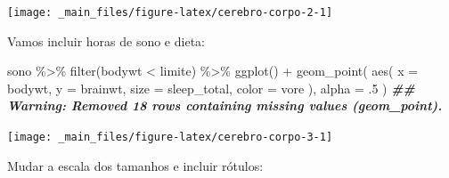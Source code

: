 \documentclass[
  11pt]{report}
\newenvironment{Shaded}{\begin{snugshade}}{\end{snugshade}}
\newcommand{\AttributeTok}[1]{\textcolor[rgb]{0.77,0.63,0.00}{#1}}
\newcommand{\DecValTok}[1]{\textcolor[rgb]{0.00,0.00,0.81}{#1}}
\newcommand{\DocumentationTok}[1]{\textcolor[rgb]{0.56,0.35,0.01}{\textbf{\textit{#1}}}}
\newcommand{\FunctionTok}[1]{\textcolor[rgb]{0.00,0.00,0.00}{#1}}
\newcommand{\NormalTok}[1]{#1}
\newcommand{\SpecialCharTok}[1]{\textcolor[rgb]{0.00,0.00,0.00}{#1}}
\begin{document}
\begin{center}\texttt{[image: \_main\_files/figure-latex/cerebro-corpo-2-1]} \end{center}

Vamos incluir horas de sono e dieta:

\begin{Shaded}
\begin{Highlighting}[]
\NormalTok{sono }\SpecialCharTok{\%\textgreater{}\%} 
  \FunctionTok{filter}\NormalTok{(bodywt }\SpecialCharTok{\textless{}}\NormalTok{ limite) }\SpecialCharTok{\%\textgreater{}\%} 
  \FunctionTok{ggplot}\NormalTok{() }\SpecialCharTok{+}
    \FunctionTok{geom\_point}\NormalTok{(}
      \FunctionTok{aes}\NormalTok{(}
        \AttributeTok{x =}\NormalTok{ bodywt, }
        \AttributeTok{y =}\NormalTok{ brainwt,}
        \AttributeTok{size =}\NormalTok{ sleep\_total,}
        \AttributeTok{color =}\NormalTok{ vore}
\NormalTok{      ), }
      \AttributeTok{alpha =}\NormalTok{ .}\DecValTok{5}
\NormalTok{    )}
\DocumentationTok{\#\# Warning: Removed 18 rows containing missing values (geom\_point).}
\end{Highlighting}
\end{Shaded}

\begin{center}\texttt{[image: \_main\_files/figure-latex/cerebro-corpo-3-1]} \end{center}

Mudar a escala dos tamanhos e incluir rótulos:
\end{document}
